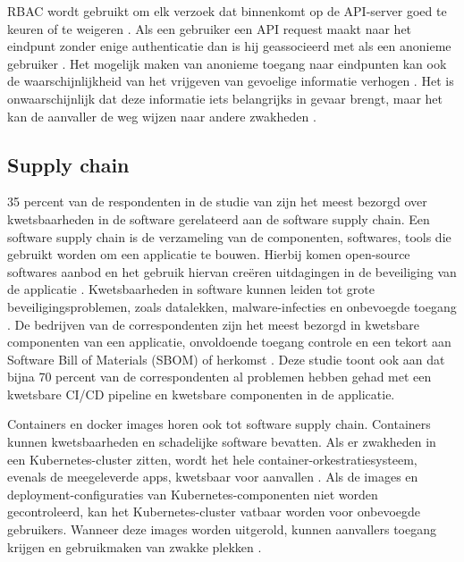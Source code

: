 RBAC wordt gebruikt om elk verzoek dat binnenkomt op de API-server goed te keuren of te weigeren \autocite{mytilinakis2020attack}. Als een gebruiker een API request maakt naar het eindpunt zonder enige authenticatie dan is hij geassocieerd met als een anonieme gebruiker \autocite{mytilinakis2020attack}. Het mogelijk maken van anonieme toegang naar eindpunten kan ook de waarschijnlijkheid van het vrijgeven van gevoelige informatie verhogen \autocite{Rice2018}. Het is onwaarschijnlijk dat deze informatie iets belangrijks in gevaar brengt, maar het kan de aanvaller de weg wijzen naar andere zwakheden \autocite{Rice2018}.

\subsection{Supply chain}
35 percent van de respondenten in de studie van \textcite{red-hat-2023} zijn het meest bezorgd over kwetsbaarheden in de software gerelateerd aan de software supply chain. Een software supply chain is de verzameling van de componenten, softwares, tools die gebruikt worden om een applicatie te bouwen. Hierbij komen open-source softwares aanbod en het gebruik hiervan creëren uitdagingen in de beveiliging van de applicatie \autocite{red-hat-2023}. Kwetsbaarheden in software kunnen leiden tot grote beveiligingsproblemen, zoals datalekken, malware-infecties en onbevoegde toegang \autocite{shamim2020xi}. De bedrijven van de correspondenten zijn het meest bezorgd in kwetsbare componenten van een applicatie, onvoldoende toegang controle en een tekort aan Software Bill of Materials (SBOM) of herkomst \autocite{red-hat-2023}. Deze studie toont ook aan dat bijna 70 percent van de correspondenten al problemen hebben gehad met een kwetsbare CI/CD pipeline en kwetsbare componenten in de applicatie. \newline

Containers en docker images horen ook tot software supply chain. Containers kunnen kwetsbaarheden en schadelijke software bevatten. Als er zwakheden in een Kubernetes-cluster zitten, wordt het hele container-orkestratiesysteem, evenals de meegeleverde apps, kwetsbaar voor aanvallen \autocite{shamim2020xi}. Als de images en deployment-configuraties van Kubernetes-componenten niet worden gecontroleerd, kan het Kubernetes-cluster vatbaar worden voor onbevoegde gebruikers. Wanneer deze images worden uitgerold, kunnen aanvallers toegang krijgen en gebruikmaken van zwakke plekken \autocite{shamim2020xi}. \newline


